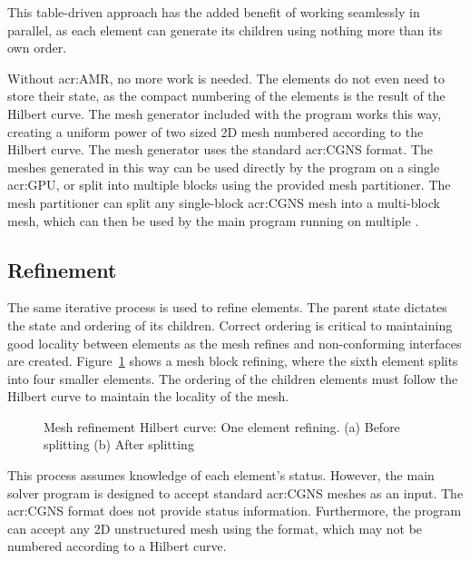 This table-driven approach has the added benefit of working seamlessly in parallel, as each element
can generate its children using nothing more than its own order.

Without \acrlong{acr:AMR}, no more work is needed. The elements do not even need to store their
state, as the compact numbering of the elements is the result of the Hilbert curve. The mesh
generator included with the program works this way, creating a uniform power of two sized 2D mesh
numbered according to the Hilbert curve. The mesh generator uses the standard \acrshort{acr:CGNS}
format. The meshes generated in this way can be used directly by the program on a single
\acrshort{acr:GPU}, or split into multiple blocks using the provided mesh partitioner. The mesh
partitioner can split any single-block \acrshort{acr:CGNS} mesh into a multi-block mesh, which can
then be used by the main program running on multiple .

\subsection{Refinement}\label{section:load_balancing:hilbert_curve:refinement}

The same iterative process is used to refine elements. The parent state dictates the state and
ordering of its children. Correct ordering is critical to maintaining good locality between elements
as the mesh refines and non-conforming interfaces are created. Figure~\ref{fig:hilbert_refining}
shows a mesh block refining, where the sixth element splits into four smaller elements. The ordering
of the children elements must follow the Hilbert curve to maintain the locality of the mesh.

\begin{figure}[H]
	\centering
	\hfill
	\caption{Mesh refinement Hilbert curve: One element refining. (a) Before splitting (b) After splitting}\label{fig:hilbert_refining}
\end{figure}

This process assumes knowledge of each element's status. However, the main solver program is
designed to accept standard \acrshort{acr:CGNS} meshes as an input. The \acrshort{acr:CGNS} format
does not provide status information. Furthermore, the program can accept any 2D unstructured mesh
using the format, which may not be numbered according to a Hilbert curve. 

